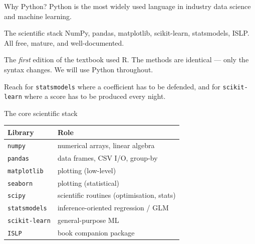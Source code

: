 \documentclass[aspectratio=169,11pt]{beamer}
\begin{document}
\begin{frame}{Why Python?}
  Python is the most widely used language in industry data science
  and machine learning.
  \begin{block}{The scientific stack}
    NumPy, pandas, matplotlib, scikit-learn, statsmodels, ISLP. All
    free, mature, and well-documented.
  \end{block}
  \begin{readme}
    The \emph{first} edition of the textbook used R. The methods are
    identical --- only the syntax changes. We will use Python
    throughout.
  \end{readme}
  \begin{takeaway}
    Reach for \texttt{statsmodels} where a coefficient has to be defended, and for
    \texttt{scikit-learn} where a score has to be produced every night.
  \end{takeaway}
\end{frame}

\begin{frame}{The core scientific stack}
  \begin{tabular}{ll}
    \toprule
    \textbf{Library} & \textbf{Role} \\
    \midrule
    \texttt{numpy} & numerical arrays, linear algebra \\
    \texttt{pandas} & data frames, CSV I/O, group-by \\
    \texttt{matplotlib} & plotting (low-level) \\
    \texttt{seaborn} & plotting (statistical) \\
    \texttt{scipy} & scientific routines (optimisation, stats) \\
    \texttt{statsmodels} & inference-oriented regression / GLM \\
    \texttt{scikit-learn} & general-purpose ML \\
    \texttt{ISLP} & book companion package \\
    \bottomrule
  \end{tabular}
\end{frame}
\end{document}
